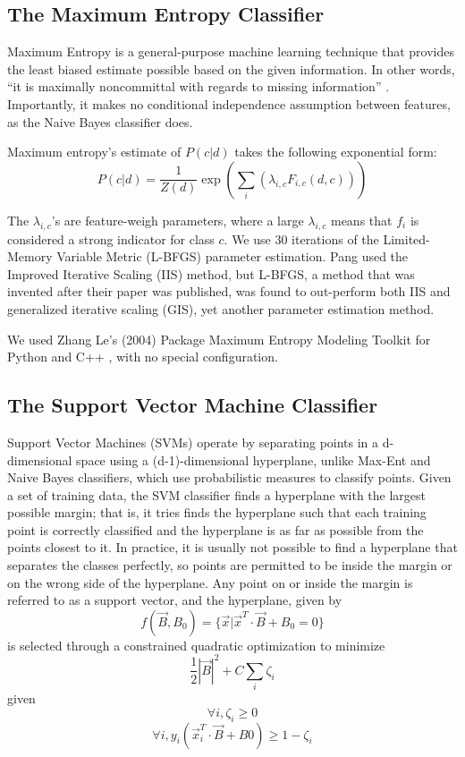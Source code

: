 \documentclass[10pt,twocolumn,letterpaper]{article}
\begin{document}
\subsection{The Maximum Entropy Classifier}

Maximum Entropy is a general-purpose machine learning technique that provides the least biased estimate possible based on the given information. In other words, ``it is maximally noncommittal with regards to missing information'' \cite{Jaynes}. Importantly, it makes no conditional independence assumption between features, as the Naive Bayes classifier does.

Maximum entropy's estimate of $P(c|d)$ takes the following exponential form:
$$P(c|d) = \frac{1}{Z(d)} \exp(\sum_i(\lambda_{i,c} F_{i,c}(d,c)))$$

The $\lambda_{i,c}$'s are feature-weigh parameters, where a large $\lambda_{i,c}$ means that $f_i$ is considered a strong indicator for class $c$. We use 30 iterations of the Limited-Memory Variable Metric (L-BFGS) parameter estimation. Pang used the Improved Iterative Scaling (IIS) method, but L-BFGS, a method that was invented after their paper was published, was found to out-perform both IIS and generalized iterative scaling (GIS), yet another parameter estimation method. 

We used Zhang Le's (2004) Package Maximum Entropy Modeling Toolkit for Python and C++ \cite{Le}, with no special configuration.

\subsection{The Support Vector Machine Classifier}

Support Vector Machines (SVMs) operate by separating points in a d-dimensional space using a (d-1)-dimensional hyperplane, unlike Max-Ent and Naive Bayes classifiers, which use probabilistic measures to classify points. Given a set of training data, the SVM classifier finds a hyperplane with the largest possible margin; that is, it tries finds the hyperplane such that each training point is correctly classified and the hyperplane is as far as possible from the points closest to it. In practice, it is usually not possible to find a hyperplane that separates the classes perfectly, so points are permitted to be inside the margin or on the wrong side of the hyperplane. Any point on or inside the margin is referred to as a support vector, and the hyperplane, given by
$$f(\vec{B}, B_0) = \{\vec{x} | \vec{x}^T \cdot \vec{B} + B_0 = 0\}$$
is selected through a constrained quadratic optimization to minimize 
$$ \frac{1}{2} |\vec{B}|^2 + C\sum_i \zeta_i$$
given
$$\forall i, \zeta_i \ge 0$$
$$\forall i, y_i  (\vec{x}_i^T \cdot \vec{B} + B0) \ge 1 - \zeta_i $$
\end{document}

